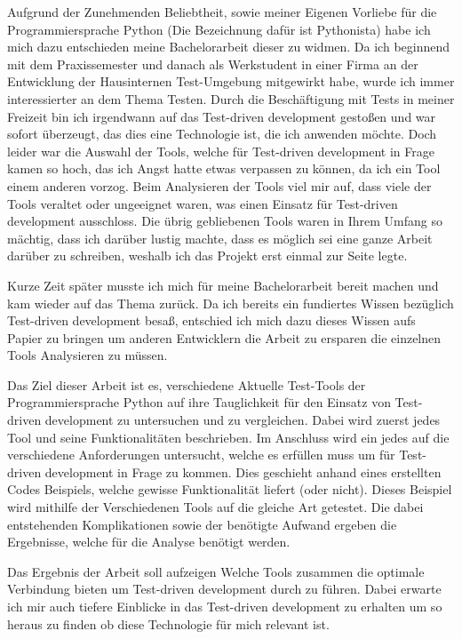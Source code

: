 Aufgrund der Zunehmenden Beliebtheit, sowie meiner Eigenen Vorliebe für die
Programmiersprache Python (Die Bezeichnung dafür ist \Gls{Pythonista}) habe ich
mich dazu entschieden meine Bachelorarbeit dieser zu widmen. Da ich beginnend
mit dem Praxissemester und danach als Werkstudent in einer Firma an der
Entwicklung der Hausinternen Test-Umgebung mitgewirkt habe, wurde ich immer
interessierter an dem Thema Testen. Durch die Beschäftigung mit Tests in meiner
Freizeit bin ich irgendwann auf das Test-driven development gestoßen und war
sofort überzeugt, das dies eine Technologie ist, die ich anwenden möchte. Doch
leider war die Auswahl der Tools, welche für Test-driven development in Frage
kamen so hoch, das ich Angst hatte etwas verpassen zu können, da ich ein Tool
einem anderen vorzog. Beim Analysieren der Tools viel mir auf, dass viele der
Tools veraltet oder ungeeignet waren, was einen Einsatz für Test-driven
development ausschloss. Die übrig gebliebenen Tools waren in Ihrem Umfang so
mächtig, dass ich darüber lustig machte, dass es möglich sei eine ganze Arbeit
darüber zu schreiben, weshalb ich das Projekt erst einmal zur Seite legte.

Kurze Zeit später musste ich mich für meine Bachelorarbeit bereit machen und
kam wieder auf das Thema zurück. Da ich bereits ein fundiertes Wissen bezüglich
Test-driven development besaß, entschied ich mich dazu dieses Wissen aufs
Papier zu bringen um anderen Entwicklern die Arbeit zu ersparen die einzelnen
Tools Analysieren zu müssen.

Das Ziel dieser Arbeit ist es, verschiedene Aktuelle Test-Tools der
Programmiersprache Python auf ihre Tauglichkeit für den Einsatz von Test-driven
development zu untersuchen und zu vergleichen. Dabei wird zuerst jedes Tool und
seine Funktionalitäten beschrieben. Im Anschluss wird ein jedes auf die
verschiedene Anforderungen untersucht, welche es erfüllen muss um für
Test-driven development in Frage zu kommen. Dies geschieht anhand eines
erstellten Codes Beispiels, welche gewisse Funktionalität liefert (oder nicht).
Dieses Beispiel wird mithilfe der Verschiedenen Tools auf die gleiche Art
getestet. Die dabei entstehenden Komplikationen sowie der benötigte Aufwand
ergeben die Ergebnisse, welche für die Analyse benötigt werden.

Das Ergebnis der Arbeit soll aufzeigen Welche Tools zusammen die optimale
Verbindung bieten um Test-driven development durch zu führen. Dabei erwarte ich
mir auch tiefere Einblicke in das Test-driven development zu erhalten um so
heraus zu finden ob diese Technologie für mich relevant ist.

